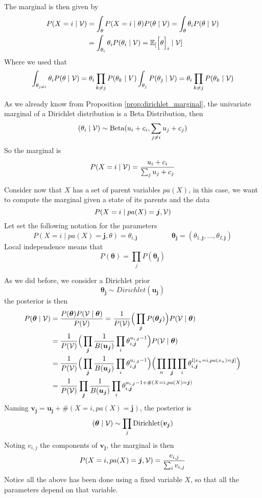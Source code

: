 The marginal is then given by
\[
  \begin{aligned}
    P(X=i \mid \mathcal{V}) &= \int_{\theta}P(X=i \mid \theta)P(\theta \mid \mathcal{V}) =  \int_{\theta}\theta_{i}P(\theta \mid \mathcal{V})\\
    &=  \int_{\theta_{i}}\theta_{i}P(\theta_{i} \mid \mathcal{V}) = \mathbb{E}_{[}\Big[\theta\Big]_{i} \mid \mathcal{V}]
\end{aligned}
\]
Where we used that
\[\int_{\theta_{j \neq i}}\theta_{i} P(\theta \mid \mathcal{V}) = \theta_{i}\prod_{k\neq j}P(\theta_{k} \mid V) \int_{\theta_{j}}P(\theta_{j}\mid \mathcal{V}) = \theta_{i} \prod_{k \neq j}P(\theta_{k} \mid \mathcal{V})\]


As we already know from Proposition \ref{prop:dirichlet_marginal}, the univariate marginal of a Dirichlet distribution is a
Beta Distribution, then
\[
  (\theta_{i} \mid \mathcal{V}) \sim \text{Beta}(u_{i} + c_{i}, \sum_{j\neq i} u_{j} + c_{j})
\]
So the marginal is
\[
  P(X = i \mid \mathcal{V}) = \frac{u_{i} + c_{i}}{\sum_{j}u_{j} + c_{j}}
\]


Consider now that \(X\) has a set of parent variables \(pa(X)\), in this case,
we want to compute the marginal given a state of its parents and the data
\[
  P(X = i \mid pa(X) = \bm{j}, \mathcal{V})
\]
Let set the following notation for the parameters
\[
  P(X = i \mid pa(X) = \bm{j}, \theta) = \theta_{i,\bm{j}} \hspace{2cm} \bm{\theta_{j}} = (\theta_{1,\bm{j}},\dots, \theta_{I,\bm{j}})
\]
Local independence means that
\[
  P(\bm{\theta}) = \prod_{j}P(\bm{\theta_{j}})
\]

As we did before, we consider a Dirichlet prior
\[
  \bm{\theta_{j}} \sim Dirichlet(\bm{u_{j}})
\]
the posterior is then
\[
  \begin{aligned}
    P(\bm{\theta} \mid \mathcal{V}) &= \frac{P(\bm{\theta})P(\mathcal{V} \mid \bm{\theta}) }{P(\mathcal{V})} = \frac{1}{P(\mathcal{V})}\Big(\prod_{\bm{j}}P(\bm{\theta_{j}}) \Big)P(\mathcal{V} \mid \bm{\theta}) \\
    &= \frac{1}{P(\mathcal{V})}\Big(\prod_{\bm{j}}\frac{1}{B(\bm{u_{j}})}\prod_{i}\theta_{i,\bm{j}}^{u_{i,\bm{j}}-1}\Big) P(\mathcal{V} \mid \bm{\theta})\\
    &= \frac{1}{P(\mathcal{V})}\Big(\prod_{\bm{j}}\frac{1}{B(\bm{u_{j}})}\prod_{i}\theta_{i,\bm{j}}^{u_{i,\bm{j}}-1}\Big) \Big(\prod_{n}\prod_{\bm{j}}\prod_{i} \theta_{i,\bm{j}}^{\mathbb{I}[x_{n} = i, pa(x_{n}) = \bm{j}]}\Big)\\
    &= \frac{1}{P(\mathcal{V})}\prod_{\bm{j}}\frac{1}{B(\bm{u_{j}})}\prod_{i}\theta_{i,\bm{j}}^{u_{i,\bm{j}}-1 + \#(X = i,pa(X)=\bm{j})}
  \end{aligned}
\]
Naming \(\bm{v_{j}} = \bm{u_{j}} + \#(X = i, pa(X) = \bm{j})\), the posterior
is
\[
  (\bm{\theta} \mid \mathcal{V}) \sim \prod_{j}\text{Dirichlet}(\bm{v_{j}})
\]
Noting \(v_{i,j}\) the components of \(\bm{v_{j}}\), the marginal is then
\[
  P(X=i, pa(X) = \bm{j}, \mathcal{V}) = \frac{v_{i,j}}{\sum_{i}v_{i,j}}
\]
Notice all the above has been done using a fixed variable \(X\), so that all the parameters depend on that variable.

